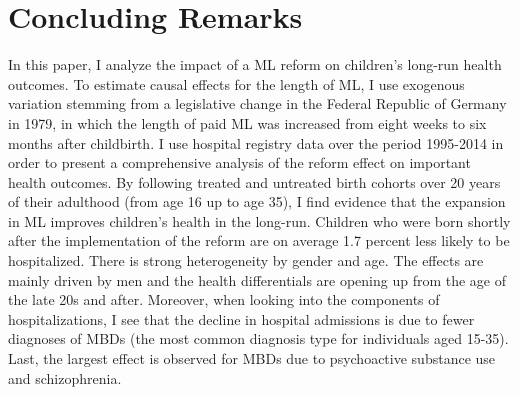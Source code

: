 \documentclass[11pt, a4paper, draft]{article} %
\begin{document}











\bigskip
\section{Concluding Remarks}\label{sec:conclusion}

In this paper, I analyze the impact of a ML reform on children's long-run health outcomes. To estimate causal effects for the length of ML, I use exogenous variation stemming from a legislative change in the Federal Republic of Germany in 1979, in which the length of paid ML was increased from eight weeks to six months after childbirth. I use hospital registry data over the period 1995-2014 in order to present a comprehensive analysis of the reform effect on important health outcomes. By following treated and untreated birth cohorts over 20 years of their adulthood (from age 16 up to age 35), I find evidence that the expansion in ML improves children's health in the long-run. Children who were born shortly after the implementation of the reform are on average 1.7 percent less likely to be hospitalized. There is strong heterogeneity by gender and age. The effects are mainly driven by men and the health differentials are opening up from the age of the late 20s and after. Moreover, when looking into the components of hospitalizations, I see that the decline in hospital admissions is due to fewer diagnoses of MBDs (the most common diagnosis type for individuals aged 15-35). Last, the largest effect is observed for MBDs due to psychoactive substance use and schizophrenia.
\end{document}
